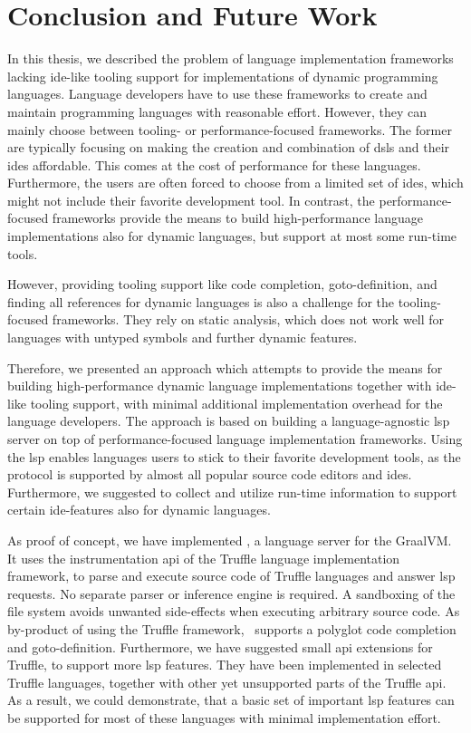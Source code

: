 
\section{Conclusion and Future Work}
\label{cha:conclusion}

In this thesis, we described the problem of language implementation frameworks lacking \ac{ide}-like tooling support for implementations of dynamic programming languages. Language developers have to use these frameworks to create and maintain programming languages with reasonable effort. However, they can mainly choose between tooling- or performance-focused frameworks. The former are typically focusing on making the creation and combination of \acp{dsl} and their \acp{ide} affordable. This comes at the cost of performance for these languages. Furthermore, the users are often forced to choose from a limited set of \acp{ide}, which might not include their favorite development tool. In contrast, the performance-focused frameworks provide the means to build high-performance language implementations also for dynamic languages, but support at most some run-time tools.

However, providing tooling support like code completion, goto-definition, and finding all references for dynamic languages is also a challenge for the tooling-focused frameworks. They rely on static analysis, which does not work well for languages with untyped symbols and further dynamic features.

Therefore, we presented an approach which attempts to provide the means for building high-performance dynamic language implementations together with \ac{ide}-like tooling support, with minimal additional implementation overhead for the language developers. The approach is based on building a language-agnostic \ac{lsp} server on top of performance-focused language implementation frameworks. Using the \ac{lsp} enables languages users to stick to their favorite development tools, as the protocol is supported by almost all popular source code editors and \acp{ide}. Furthermore, we suggested to collect and utilize run-time information to support certain \ac{ide}-features also for dynamic languages.

As proof of concept, we have implemented \graallsp, a language server for the GraalVM. It uses the instrumentation \ac{api} of the Truffle language implementation framework, to parse and execute source code of Truffle languages and answer \ac{lsp} requests. No separate parser or inference engine is required. A sandboxing of the file system avoids unwanted side-effects when executing arbitrary source code. As by-product of using the Truffle framework, \graallsp~supports a polyglot code completion and goto-definition. Furthermore, we have suggested small \ac{api} extensions for Truffle, to support more \ac{lsp} features. They have been implemented in selected Truffle languages, together with other yet unsupported parts of the Truffle \ac{api}. As a result, we could demonstrate, that a basic set of important \ac{lsp} features can be supported for most of these languages with minimal implementation effort.

